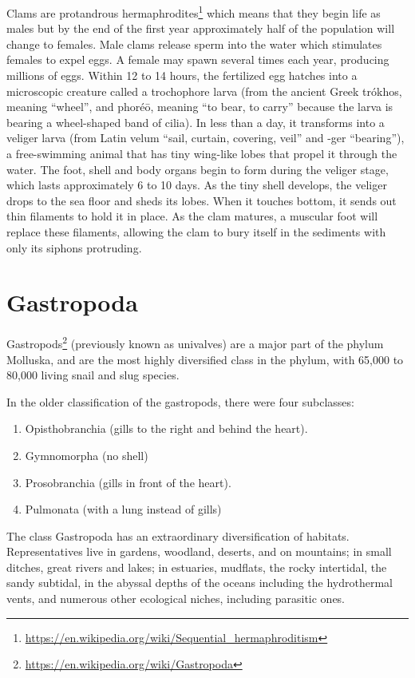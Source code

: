 \documentclass[]{book}
\providecommand{\tightlist}{%
  \setlength{\itemsep}{0pt}\setlength{\parskip}{0pt}}
\let\rmarkdownfootnote\footnote%
\def\footnote{\protect\rmarkdownfootnote}
\renewcommand{\href}[2]{#2\footnote{\url{#1}}}
\theoremstyle{definition}
\theoremstyle{definition}
\theoremstyle{definition}
\theoremstyle{remark}
\begin{document}
Clams are
\href{https://en.wikipedia.org/wiki/Sequential_hermaphroditism}{protandrous
hermaphrodites} which means that they begin life as males but by the end
of the first year approximately half of the population will change to
females. Male clams release sperm into the water which stimulates
females to expel eggs. A female may spawn several times each year,
producing millions of eggs. Within 12 to 14 hours, the fertilized egg
hatches into a microscopic creature called a trochophore larva (from the
ancient Greek trókhos, meaning ``wheel'', and phoréō, meaning ``to bear,
to carry'' because the larva is bearing a wheel-shaped band of cilia).
In less than a day, it transforms into a veliger larva (from Latin velum
``sail, curtain, covering, veil'' and -ger ``bearing''), a free-swimming
animal that has tiny wing-like lobes that propel it through the water.
The foot, shell and body organs begin to form during the veliger stage,
which lasts approximately 6 to 10 days. As the tiny shell develops, the
veliger drops to the sea floor and sheds its lobes. When it touches
bottom, it sends out thin filaments to hold it in place. As the clam
matures, a muscular foot will replace these filaments, allowing the clam
to bury itself in the sediments with only its siphons protruding.

\section{Gastropoda}\label{gastropoda}

\href{https://en.wikipedia.org/wiki/Gastropoda}{Gastropods} (previously
known as univalves) are a major part of the phylum Molluska, and are the
most highly diversified class in the phylum, with 65,000 to 80,000
living snail and slug species.

In the older classification of the gastropods, there were four
subclasses:

\begin{enumerate}
\def\labelenumi{\arabic{enumi}.}
\tightlist
\item
  Opisthobranchia (gills to the right and behind the heart).
\item
  Gymnomorpha (no shell)
\item
  Prosobranchia (gills in front of the heart).
\item
  Pulmonata (with a lung instead of gills)
\end{enumerate}

The class Gastropoda has an extraordinary diversification of habitats.
Representatives live in gardens, woodland, deserts, and on mountains; in
small ditches, great rivers and lakes; in estuaries, mudflats, the rocky
intertidal, the sandy subtidal, in the abyssal depths of the oceans
including the hydrothermal vents, and numerous other ecological niches,
including parasitic ones.
\end{document}
